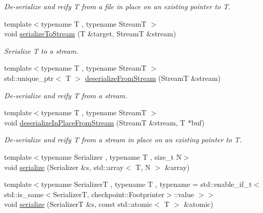 \begin{DoxyCompactItemize}
\begin{DoxyCompactList}\small\item\em De-\/serialize and reify {\ttfamily T} from a file in place on an existing pointer to {\ttfamily T}. \end{DoxyCompactList}\item 
{\footnotesize template$<$typename T , typename StreamT $>$ }\\void \hyperlink{namespacecheckpoint_a6d52d7faa50354bc079e1d864963d29c}{serialize\+To\+Stream} (T \&target, StreamT \&stream)
\begin{DoxyCompactList}\small\item\em Serialize {\ttfamily T} to a stream. \end{DoxyCompactList}\item 
{\footnotesize template$<$typename T , typename StreamT $>$ }\\std\+::unique\+\_\+ptr$<$ T $>$ \hyperlink{namespacecheckpoint_aa9a7965554c62b089bb326961747368d}{deserialize\+From\+Stream} (StreamT \&stream)
\begin{DoxyCompactList}\small\item\em De-\/serialize and reify {\ttfamily T} from a stream. \end{DoxyCompactList}\item 
{\footnotesize template$<$typename T , typename StreamT $>$ }\\void \hyperlink{namespacecheckpoint_ac5e1b98b72e9fa58cda71b79a009e1db}{deserialize\+In\+Place\+From\+Stream} (StreamT \&stream, T $\ast$buf)
\begin{DoxyCompactList}\small\item\em De-\/serialize and reify {\ttfamily T} from a stream in place on an existing pointer to {\ttfamily T}. \end{DoxyCompactList}\item 
{\footnotesize template$<$typename Serializer , typename T , size\+\_\+t N$>$ }\\void \hyperlink{namespacecheckpoint_a976e83bf5f22b7bfc5036fd829be039e}{serialize} (Serializer \&s, std\+::array$<$ T, N $>$ \&array)
\item 
{\footnotesize template$<$typename SerializerT , typename T , typename  = std\+::enable\+\_\+if\+\_\+t$<$    std\+::is\+\_\+same$<$\+Serializer\+T, checkpoint\+::\+Footprinter$>$\+::value  $>$$>$ }\\void \hyperlink{namespacecheckpoint_a40ca9a5c99807bd8a0610098d94b5125}{serialize} (SerializerT \&s, const std\+::atomic$<$ T $>$ \&atomic)
\item 

\end{DoxyCompactItemize}
